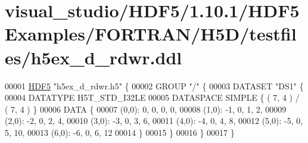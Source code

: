 \hypertarget{visual__studio_2_h_d_f5_21_810_81_2_h_d_f5_examples_2_f_o_r_t_r_a_n_2_h5_d_2testfiles_2h5ex__d__rdwr_8ddl_source}{}\section{visual\+\_\+studio/\+H\+D\+F5/1.10.1/\+H\+D\+F5\+Examples/\+F\+O\+R\+T\+R\+A\+N/\+H5\+D/testfiles/h5ex\+\_\+d\+\_\+rdwr.ddl}
\label{visual__studio_2_h_d_f5_21_810_81_2_h_d_f5_examples_2_f_o_r_t_r_a_n_2_h5_d_2testfiles_2h5ex__d__rdwr_8ddl_source}

\begin{DoxyCode}
00001 \hyperlink{namespace_h_d_f5}{HDF5} \textcolor{stringliteral}{"h5ex\_d\_rdwr.h5"} \{
00002 GROUP \textcolor{stringliteral}{"/"} \{
00003    DATASET \textcolor{stringliteral}{"DS1"} \{
00004       DATATYPE  H5T\_STD\_I32LE
00005       DATASPACE  SIMPLE \{ ( 7, 4 ) / ( 7, 4 ) \}
00006       DATA \{
00007       (0,0): 0, 0, 0, 0,
00008       (1,0): -1, 0, 1, 2,
00009       (2,0): -2, 0, 2, 4,
00010       (3,0): -3, 0, 3, 6,
00011       (4,0): -4, 0, 4, 8,
00012       (5,0): -5, 0, 5, 10,
00013       (6,0): -6, 0, 6, 12
00014       \}
00015    \}
00016 \}
00017 \}
\end{DoxyCode}
